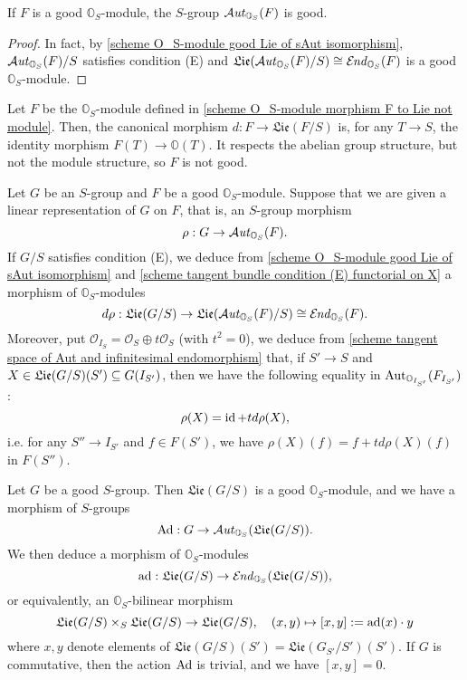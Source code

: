 \begin{theorem}\label{scheme O_S-module good Aut is good}
If $F$ is a good $\mathbb{O}_S$-module, the $S$-group $\operatorname{\mathcal{A}\hspace*{-0.2pt}\textit{ut}\hspace{0.5pt}}_{\mathbb{O}_S}(F)$ is good.
\end{theorem}
\begin{proof}
In fact, by \cref{scheme O_S-module good Lie of sAut isomorphism}, $\operatorname{\mathcal{A}\hspace*{-0.2pt}\textit{ut}\hspace{0.5pt}}_{\mathbb{O}_S}(F)/S$ satisfies condition (E) and $\mathfrak{Lie}(\operatorname{\mathcal{A}\hspace*{-0.2pt}\textit{ut}\hspace{0.5pt}}_{\mathbb{O}_S}(F)/S)\cong\operatorname{\mathcal{E}\hspace*{-1pt}\textit{nd}\hspace{0.5pt}}_{\mathbb{O}_S}(F)$ is a good $\mathbb{O}_S$-module.
\end{proof}

\begin{example}\label{scheme O_S-module p-twisted G_m not good}
Let $F$ be the $\mathbb{O}_S$-module defined in \cref{scheme O_S-module morphism F to Lie not module}. Then, the canonical morphism $d:F\to\mathfrak{Lie}(F/S)$ is, for any $T\to S$, the identity morphism $F(T)\to\mathbb{O}(T)$. It respects the abelian group structure, but not the module structure, so $F$ is not good.
\end{example}

Let $G$ be an $S$-group and $F$ be a good $\mathbb{O}_S$-module. Suppose that we are given a linear representation of $G$ on $F$, that is, an $S$-group morphism
\[\rho:G\to\operatorname{\mathcal{A}\hspace*{-0.2pt}\textit{ut}\hspace{0.5pt}}_{\mathbb{O}_S}(F).\]
If $G/S$ satisfies condition (E), we deduce from \cref{scheme O_S-module good Lie of sAut isomorphism} and \cref{scheme tangent bundle condition (E) functorial on X} a morphism of $\mathbb{O}_S$-modules
\[d\rho:\mathfrak{Lie}(G/S)\to\mathfrak{Lie}(\operatorname{\mathcal{A}\hspace*{-0.2pt}\textit{ut}\hspace{0.5pt}}_{\mathbb{O}_S}(F)/S)\cong\operatorname{\mathcal{E}\hspace*{-1pt}\textit{nd}\hspace{0.5pt}}_{\mathbb{O}_S}(F).\]
Moreover, put $\mathscr{O}_{I_S}=\mathscr{O}_S\oplus t\mathscr{O}_S$ (with $t^2=0$), we deduce from \cref{scheme tangent space of Aut and infinitesimal endomorphism} that, if $S'\to S$ and $X\in\mathfrak{Lie}(G/S)(S')\subseteq G(I_{S'})$, then we have the following equality in $\mathrm{Aut}_{\mathbb{O}_{I_{S'}}}(F_{I_{S'}})$:
\begin{equation}\label{scheme group derived morphism of linear representation equality}
\rho(X)=\operatorname{id}+t d\rho(X),
\end{equation}
i.e. for any $S''\to I_{S'}$ and $f\in F(S')$, we have $\rho(X)(f)=f+td\rho(X)(f)$ in $F(S'')$.\par
Let $G$ be a good $S$-group. Then $\mathfrak{Lie}(G/S)$ is a good $\mathbb{O}_S$-module, and we have a morphism of $S$-groups
\[\mathrm{Ad}:G\to\operatorname{\mathcal{A}\hspace*{-0.2pt}\textit{ut}\hspace{0.5pt}}_{\mathbb{O}_S}(\mathfrak{Lie}(G/S)).\]
We then deduce a morphism of $\mathbb{O}_S$-modules
\[\mathrm{ad}:\mathfrak{Lie}(G/S)\to\operatorname{\mathcal{E}\hspace*{-1pt}\textit{nd}\hspace{0.5pt}}_{\mathbb{O}_S}(\mathfrak{Lie}(G/S)),\]
or equivalently, an $\mathbb{O}_S$-bilinear morphism
\[\mathfrak{Lie}(G/S)\times_S\mathfrak{Lie}(G/S)\to\mathfrak{Lie}(G/S),\quad (x,y)\mapsto [x,y]:=\mathrm{ad}(x)\cdot y\]
where $x,y$ denote elements of $\mathfrak{Lie}(G/S)(S')=\mathfrak{Lie}(G_{S'}/S')(S')$. If $G$ is commutative, then the action $\mathrm{Ad}$ is trivial, and we have $[x,y]=0$.

